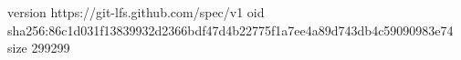 version https://git-lfs.github.com/spec/v1
oid sha256:86c1d031f13839932d2366bdf47d4b22775f1a7ee4a89d743db4c59090983e74
size 299299
